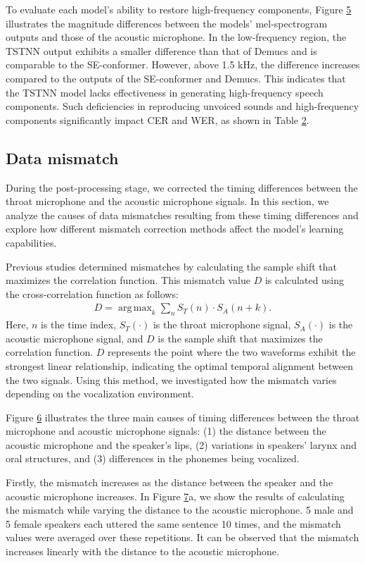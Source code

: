 \documentclass[10pt]{wlscirep}
\DeclareMathOperator*{\argmax}{arg\,max}
\begin{document}
To evaluate each model’s ability to restore high-frequency components, Figure \hyperref[fig:5]{5} illustrates the magnitude differences between the models’ mel-spectrogram outputs and those of the acoustic microphone. In the low-frequency region, the TSTNN output exhibits a smaller difference than that of Demucs and is comparable to the SE-conformer. However, above 1.5 kHz, the difference increases compared to the outputs of the SE-conformer and Demucs. This indicates that the TSTNN model lacks effectiveness in generating high-frequency speech components. Such deficiencies in reproducing unvoiced sounds and high-frequency components significantly impact CER and WER, as shown in Table \hyperref[table:2]{2}. 

\subsection*{Data mismatch}
During the post-processing stage, we corrected the timing differences between the throat microphone and the acoustic microphone signals. In this section, we analyze the causes of data mismatches resulting from these timing differences and explore how different mismatch correction methods affect the model's learning capabilities.

Previous studies determined mismatches by calculating the sample shift that maximizes the correlation function\cite{Hauret2023configEBEN}. This mismatch value $D$ is calculated using the cross-correlation function as follows:
\begin{align}
    D=\argmax_k\sum_n S_T(n)\cdot S_A(n+k).
\end{align}
Here, $n$ is the time index, $S_T(\cdot)$ is the throat microphone signal, $S_A(\cdot)$ is the acoustic microphone signal, and $D$ is the sample shift that maximizes the correlation function. $D$ represents the point where the two waveforms exhibit the strongest linear relationship, indicating the optimal temporal alignment between the two signals. Using this method, we investigated how the mismatch varies depending on the vocalization environment.

Figure \hyperref[fig:6]{6} illustrates the three main causes of timing differences between the throat microphone and acoustic microphone signals: (1) the distance between the acoustic microphone and the speaker's lips, (2) variations in speakers' larynx and oral structures, and (3) differences in the phonemes being vocalized.

Firstly, the mismatch increases as the distance between the speaker and the acoustic microphone increases. In Figure \hyperref[fig:7]{7}a, we show the results of calculating the mismatch while varying the distance to the acoustic microphone. 5 male and 5 female speakers each uttered the same sentence 10 times, and the mismatch values were averaged over these repetitions. It can be observed that the mismatch increases linearly with the distance to the acoustic microphone.
\end{document}
